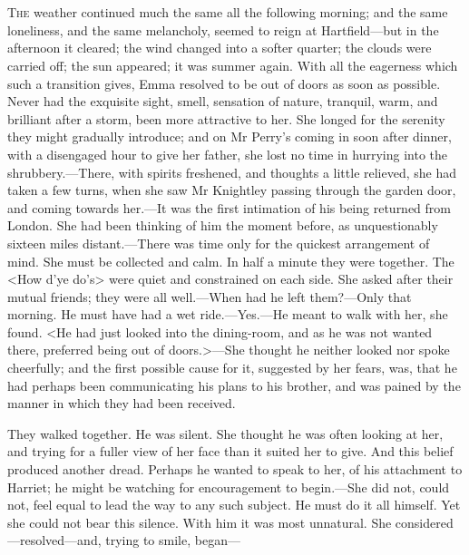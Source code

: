 \chapter[Chapter \thechapter]{}
\lettrine[lraise=0.3]{T}{he} weather continued much the same all the following morning; and the same loneliness, and the same melancholy, seemed to reign at Hartfield—but in the afternoon it cleared; the wind changed into a softer quarter; the clouds were carried off; the sun appeared; it was summer again. With all the eagerness which such a transition gives, Emma resolved to be out of doors as soon as possible. Never had the exquisite sight, smell, sensation of nature, tranquil, warm, and brilliant after a storm, been more attractive to her. She longed for the serenity they might gradually introduce; and on Mr Perry's coming in soon after dinner, with a disengaged hour to give her father, she lost no time in hurrying into the shrubbery.—There, with spirits freshened, and thoughts a little relieved, she had taken a few turns, when she saw Mr Knightley passing through the garden door, and coming towards her.—It was the first intimation of his being returned from London. She had been thinking of him the moment before, as unquestionably sixteen miles distant.—There was time only for the quickest arrangement of mind. She must be collected and calm. In half a minute they were together. The <How d'ye do's> were quiet and constrained on each side. She asked after their mutual friends; they were all well.—When had he left them?—Only that morning. He must have had a wet ride.—Yes.—He meant to walk with her, she found. <He had just looked into the dining-room, and as he was not wanted there, preferred being out of doors.>—She thought he neither looked nor spoke cheerfully; and the first possible cause for it, suggested by her fears, was, that he had perhaps been communicating his plans to his brother, and was pained by the manner in which they had been received.

They walked together. He was silent. She thought he was often looking at her, and trying for a fuller view of her face than it suited her to give. And this belief produced another dread. Perhaps he wanted to speak to her, of his attachment to Harriet; he might be watching for encouragement to begin.—She did not, could not, feel equal to lead the way to any such subject. He must do it all himself. Yet she could not bear this silence. With him it was most unnatural. She considered—resolved—and, trying to smile, began—

